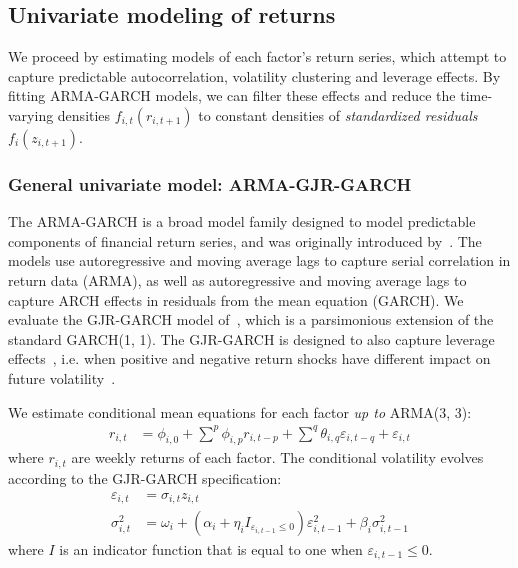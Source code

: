 
\subsection{Univariate modeling of returns} %
\label{sub:univariate_modeling_of_returns}

We proceed by estimating models of each factor's return series, which attempt to capture predictable autocorrelation, volatility clustering and leverage effects. By fitting ARMA-GARCH models, we can filter these effects and reduce the time-varying densities $f_{i,t}(r_{i,t+1})$ to constant densities of \emph{standardized residuals} $f_{i}(z_{i,t+1})$.

\subsubsection{General univariate model: ARMA-GJR-GARCH}

The ARMA-GARCH is a broad model family designed to model predictable components of financial return series, and was originally introduced by~\textcite{Bollerslev1986}. The models use autoregressive and moving average lags to capture serial correlation in return data (ARMA), as well as autoregressive and moving average lags to capture ARCH effects in residuals from the mean equation (GARCH). We evaluate the GJR-GARCH model of~\textcite{glosten1993relation}, which is a parsimonious extension of the standard GARCH(1, 1). The GJR-GARCH is designed to also capture leverage effects~\autocite{glosten1993relation}, i.e. when positive and negative return shocks have different impact on future volatility~\autocite{Black1976}.

We estimate conditional mean equations for each factor \emph{up to} ARMA(3, 3):
\begin{align}
  r_{i,t} &=
    \phi_{i,0} +
    \sum^p \phi_{i,p} r_{i,t - p} +
    \sum^q \theta_{i,q} \varepsilon_{i,t - q} + 
    \varepsilon_{i,t}
    \label{eq:garch_mean}
\end{align}
where $r_{i,t}$ are weekly returns of each factor. The conditional volatility evolves according to the GJR-GARCH specification:
\begin{align}
  \varepsilon_{i,t} &= \sigma_{i,t} z_{i,t} \\
  \sigma_{i,t}^2 &=
    \omega_i +
    (\alpha_i + \eta_i I_{\varepsilon_{i,t-1} \leq 0}) \varepsilon_{i,t - 1}^2 +
    \beta_{i} \sigma^2_{i,t - 1}
    \label{eq:garch_garch}
\end{align}
where $I$ is an indicator function that is equal to one when $\varepsilon_{i,t-1} \leq 0$. 

